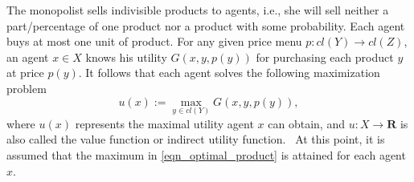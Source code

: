 \documentclass[a4paper, 11pt]{amsart}
\numberwithin{equation}{section}
\theoremstyle{plain}
\theoremstyle{definition}
\theoremstyle{remark}
\newcommand{\R}{\mathbf{R}}
\begin{document}
The monopolist sells indivisible products to agents, i.e., she will sell neither a part/percentage of one product nor a product with some probability. Each agent buys at most one unit of product. %
For any given price menu $p: cl(Y) \rightarrow cl(Z)$, an agent $x \in X$ knows his utility $G(x,y,p(y))$ for purchasing each product $y$ at price $p(y)$. It follows that each agent solves the following maximization problem 
\begin{equation}\label{eqn_optimal_product}
	u(x):=\max_{y \in cl(Y)} G(x, y, p(y)),
\end{equation}
where $u(x)$ represents the maximal utility agent $x$ can obtain, and $u: X \rightarrow \R$ is also called the value function or indirect utility function.%
~At this point, it is assumed that the maximum in \eqref{eqn_optimal_product} is attained for each agent $x$.
\medskip
\end{document}
